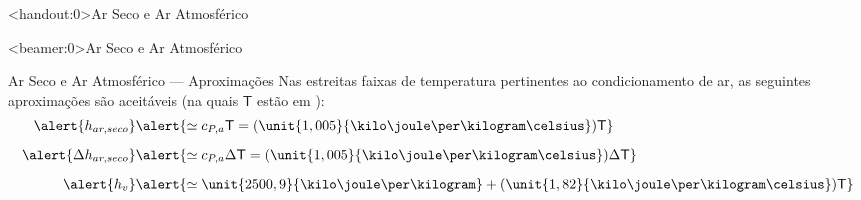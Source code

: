     {
    \begin{frame}<handout:0>{Ar Seco e Ar Atmosférico}\vspace*{-0em}
        \THISFRAMECONTENTS
    \end{frame}}
    {
    \begin{frame}<beamer:0>{Ar Seco e Ar Atmosférico}\vspace*{-0em}
        \THISFRAMECONTENTS
    \end{frame}}

    \begin{frame}{Ar Seco e Ar Atmosférico --- Aproximações}\vspace*{-0em}
        Nas \alert{estreitas faixas de temperatura} pertinentes ao \alert{condicionamento de
        ar}, as seguintes aproximações são aceitáveis (na quais $\mathsf{T}$ estão em \celsius):
        \begin{align*}
            \alert{h_{ar,seco}} &
            \alert{
                \simeq c_{P,a}\mathsf{T}
                = (\unit{1,005}{\kilo\joule\per\kilogram\celsius})\mathsf{T}
            }
            \\[\medskipamount]
            \alert{\Delta h_{ar,seco}} &
            \alert{
                \simeq c_{P,a}\Delta\mathsf{T}
                = (\unit{1,005}{\kilo\joule\per\kilogram\celsius})\Delta\mathsf{T}
            }
            \\[\medskipamount]
            \alert{h_{v}} &
            \alert{
                \simeq \unit{2500,9}{\kilo\joule\per\kilogram}
                + (\unit{1,82}{\kilo\joule\per\kilogram\celsius})\mathsf{T}
            }
        \end{align*}
    \end{frame}

